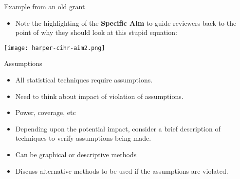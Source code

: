 \documentclass[ignorenonframetext,]{beamer}
\providecommand{\tightlist}{%
  \setlength{\itemsep}{0pt}\setlength{\parskip}{0pt}}
\begin{document}

\begin{frame}{Example from an old grant}
\protect\hypertarget{example-from-an-old-grant}{}

\begin{itemize}
\tightlist
\item
  Note the highlighting of the \textbf{Specific Aim} to guide reviewers
  back to the point of why they should look at this stupid equation:
\end{itemize}

\bigskip{}

\texttt{[image: harper-cihr-aim2.png]}

\end{frame}

\begin{frame}{Assumptions}
\protect\hypertarget{assumptions}{}

\begin{itemize}
\tightlist
\item
  All statistical techniques require assumptions.
\item
  Need to think about impact of violation of assumptions.
\item
  Power, coverage, etc
\item
  Depending upon the potential impact, consider a brief description of
  techniques to verify assumptions being made.
\item
  Can be graphical or descriptive methods
\item
  Discuss alternative methods to be used if the assumptions are
  violated.
\end{itemize}

\end{frame}
\end{document}
